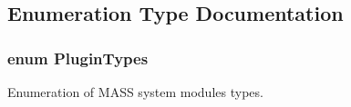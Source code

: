 \subsection{Enumeration Type Documentation}
\subsubsection[{\texorpdfstring{Plugin\+Types}{PluginTypes}}]{\setlength{\rightskip}{0pt plus 5cm}enum {\bf Plugin\+Types}}\hypertarget{group___main_menu_module_ga9b3bee49ce70df90694056c2f48c2e77}{}\label{group___main_menu_module_ga9b3bee49ce70df90694056c2f48c2e77}


Enumeration of M\+A\+SS system modules types. 

